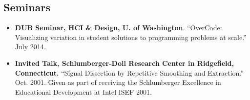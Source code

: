 \documentclass[margin]{res}
\begin{document}
\begin{resume}
\section{Seminars}
\begin{itemize}[leftmargin=*]
\item {\bf DUB Seminar, HCI \& Design, U. of Washington}. ``OverCode: Visualizing variation in student solutions to programming problems at scale.'' \hfill July 2014.
\item {\bf Invited Talk, Schlumberger-Doll Research Center in Ridgefield, Connecticut.} ``Signal Dissection by Repetitive Smoothing and Extraction.'' \hfill Oct. 2001.
Given as part of receiving the Schlumberger Excellence in Educational Development at Intel ISEF 2001.
\end{itemize}
 

\end{resume}
\end{document}
